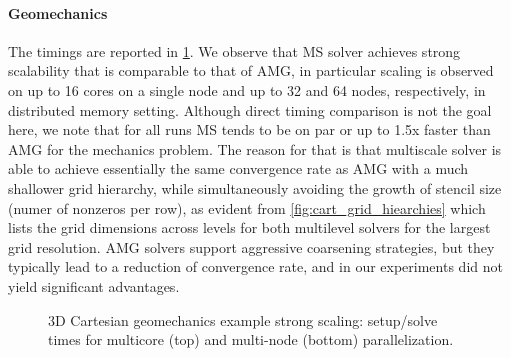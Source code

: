 \paragraph{Geomechanics}
The timings are reported in \cref{fig:cart_scaling_strong_mech}.   We observe that MS solver achieves strong scalability that is comparable to that of AMG, in particular scaling is observed on up to 16 cores on a single node and up to 32 and 64 nodes, respectively, in distributed memory setting.   Although direct timing comparison is not the goal here, we note that for all runs MS tends to be on par or up to 1.5x faster than AMG for the mechanics problem.   The reason for that is that multiscale solver is able to achieve essentially the same convergence rate as AMG with a much shallower grid hierarchy, while simultaneously avoiding the growth of stencil size (numer of nonzeros per row), as evident from \cref{fig:cart_grid_hiearchies} which lists the grid dimensions across levels for both multilevel solvers for the largest grid resolution.   AMG solvers support aggressive coarsening strategies, but they typically lead to a reduction of convergence rate, and in our experiments did not yield significant advantages.

\begin{figure} [htbp]
  \begin{subfigure}[t]{0.48\textwidth}
    \centering
    
  \end{subfigure}
  \hfill
  \begin{subfigure}[t]{0.48\textwidth}
    \centering
    
  \end{subfigure}
  \begin{subfigure}[t]{0.48\textwidth}
    \centering
    
  \end{subfigure}
  \hfill
  \begin{subfigure}[t]{0.48\textwidth}
    \centering
    
  \end{subfigure}
  \caption[3D Cartesian geomechanics example strong scaling]{3D Cartesian geomechanics example strong scaling: setup/solve times for multicore (top) and multi-node (bottom) parallelization.}
  \label{fig:cart_scaling_strong_mech}
\end{figure}

